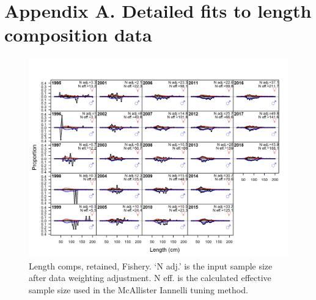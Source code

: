 \documentclass[12pt,]{article}
\begin{document}
\FloatBarrier

\newpage

\FloatBarrier
\newpage

\hypertarget{appendix-a.-detailed-fits-to-length-composition-data}{%
\section*{Appendix A. Detailed fits to length composition
data}\label{appendix-a.-detailed-fits-to-length-composition-data}}

\vspace{.5cm}

\begin{figure}[!h]
\begin{centering}
\includegraphics{r4ss/plots_mod1/comp_lenfit_flt1mkt2.png}
\caption{Length comps, retained, Fishery. ‘N adj.’ is the input sample size after data weighting adjustment. N eff. is the calculated effective sample size used in the McAllister Iannelli tuning method.}\label{fig:fig:comp_lenfit_flt1mkt2}
\end{centering}
\end{figure}
\end{document}
